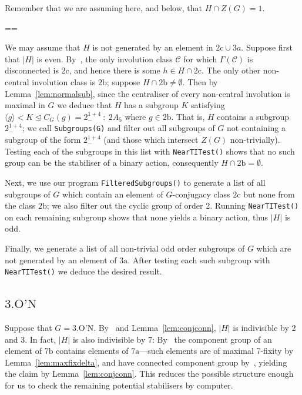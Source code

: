 \documentclass[11pt, a4paper]{amsart}
\makeatletter
\newcommand\C{\mathcal{C}}
\def\cn{\mathord{{\!\:{:}\:\!}}}
\renewcommand{\proofname}{Proof}
\renewenvironment{proof}[1][\proofname]{\par
  \pushQED{\qed}  \normalfont \partopsep=\z@skip \topsep=\z@skip
  \trivlist
  \item[\hskip\labelsep
        \scshape
    #1\@addpunct{.}]\ignorespaces
}{  \popQED\endtrivlist\@endpefalse
}
\makeatother
\begin{document}
Remember that we are assuming here, and below, that $H\cap Z(G)=1$.

\begin{proof}
    We may assume that $H$ is not generated by an element in $\mathrm{2c}\cup 3a$. Suppose first that $|H|$ is even. By~\cite[Theorem 4.2]{CDP}, the only involution class $\C$ for which $\Gamma(\mathcal{C})$ is disconnected is $\mathrm{2c}$, and hence there is some $h\in H\cap \mathrm{2c}$. The only other non-central involution class is $\mathrm{2b}$; suppose $H\cap\mathrm{2b}\ne\emptyset$. Then by Lemma~\ref{lem:normalsub}, since the centraliser of every non-central involution is maximal in $G$ we deduce that $H$ has a subgroup $K$ satisfying $\langle g\rangle <K\trianglelefteq C_G(g)=2^{1+4}_-\cn2A_5$ where $g\in \mathrm{2b}$. That is, $H$ contains a subgroup $2^{1+4}_-$; we call {\tt Subgroups(G)} and filter out all subgroups of $G$ not containing a subgroup of the form $2^{1+4}_-$ (and those which intersect $Z(G)$ non-trivially). Testing each of the subgroups in this list with {\tt NearTITest()} shows that no such group can be the stabiliser of a binary action, consequently $H\cap\mathrm{2b}=\emptyset$.

    Next, we use our program {\tt FilteredSubgroups()} to generate a list of all subgroups of $G$ which contain an element of $G$-conjugacy class $\mathrm{2c}$ but none from the class $\mathrm{2b}$; we also filter out the cyclic group of order 2. Running {\tt NearTITest()} on each remaining subgroup shows that none yields a binary action, thus $|H|$ is odd.

    Finally, we generate a list of all non-trivial odd order subgroups of $G$ which are not generated by an element of $\mathrm{3a}$. After testing each such subgroup with {\tt NearTITest()} we deduce the desired result.
\end{proof}
\subsection{$3.\mathrm{O\text{'}N}$} Suppose that $G=3.\mathrm{O\text{'}N}$. By~\cite[Theorem 1.1]{CDP} and Lemma~\ref{lem:conjconn}, $|H|$ is indivisible by 2 and 3. In fact, $|H|$ is also indivisible by 7: By~\cite[Proposition 3.2]{CDP} the component group of an element of $\mathrm{7b}$ contains elements of $\mathrm{7a}$---such elements are of maximal 7-fixity by Lemma~\ref{lem:maxfixdelta}, and have connected component group by~\cite[Proposition 3.3]{CDP}, yielding the claim by Lemma~\ref{lem:conjconn}.  This reduces the possible structure enough for us to check the remaining potential stabilisers by computer.
\end{document}
